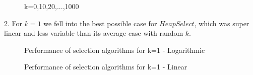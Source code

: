 \documentclass{article}
\begin{document}
\begin{figure}[H]   
  \caption{k=0,10,20,...,1000}
\end{figure} 


2. For $k=1$ we fell into the best possible case for $HeapSelect$, which was super linear and less variable than its average case with random $k$.\\

\begin{figure}[H]   
  \caption{Performance of selection algorithms for k=1 - Logarithmic}
\end{figure}
\begin{figure}[H]   
  \caption{Performance of selection algorithms for k=1 - Linear}
\end{figure}
\end{document}

